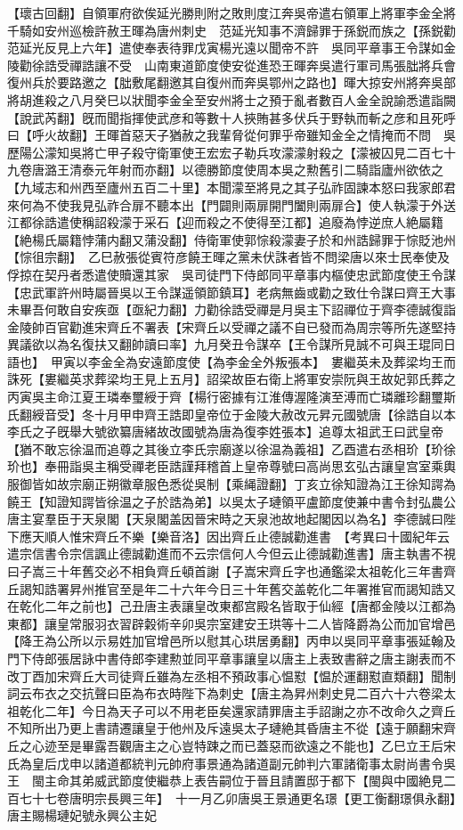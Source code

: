 【瓌古回翻】自領軍府欲俟延光勝則附之敗則度江奔吳帝遣右領軍上將軍李金全將千騎如安州巡檢許赦王暉為唐州刺史　范延光知事不濟歸罪于孫鋭而族之【孫鋭勸范延光反見上六年】遣使奉表待罪戊寅楊光遠以聞帝不許　吳同平章事王令謀如金陵勸徐誥受禪誥讓不受　山南東道節度使安從進恐王暉奔吳遣行軍司馬張朏將兵會復州兵於要路邀之【朏敷尾翻邀其自復州而奔吳鄂州之路也】暉大掠安州將奔吳部將胡進殺之八月癸巳以狀聞李金全至安州將士之預于亂者數百人金全說諭悉遣詣闕【說武芮翻】旣而聞指揮使武彦和等數十人挾賄甚多伏兵于野執而斬之彦和且死呼曰【呼火故翻】王暉首惡天子猶赦之我輩脅從何罪乎帝雖知金全之情掩而不問　吳歷陽公濛知吳將亡甲子殺守衛軍使王宏宏子勒兵攻濛濛射殺之【濛被囚見二百七十九卷唐潞王清泰元年射而亦翻】以德勝節度使周本吳之勲舊引二騎詣廬州欲依之【九域志和州西至廬州五百二十里】本聞濛至將見之其子弘祚固諫本怒曰我家郎君來何為不使我見弘祚合扉不聽本出【門闢則兩扉開門闔則兩扉合】使人執濛于外送江都徐誥遣使稱詔殺濛于采石【迎而殺之不使得至江都】追廢為悖逆庶人絶屬籍【絶楊氏屬籍悖蒲内翻又蒲没翻】侍衛軍使郭悰殺濛妻子於和州誥歸罪于悰貶池州【悰徂宗翻】　乙巳赦張從賓符彦饒王暉之黨未伏誅者皆不問梁唐以來士民奉使及俘掠在契丹者悉遣使贖還其家　吳司徒門下侍郎同平章事内樞使忠武節度使王令謀【忠武軍許州時屬晉吳以王令謀遥領節鎮耳】老病無齒或勸之致仕令謀曰齊王大事未畢吾何敢自安疾亟【亟紀力翻】力勸徐誥受禪是月吳主下詔禪位于齊李德誠復詣金陵帥百官勸進宋齊丘不署表【宋齊丘以受禪之議不自已發而為周宗等所先遂堅持異議欲以為名復扶又翻帥讀曰率】九月癸丑令謀卒【王令謀所見誠不可與王琨同日語也】　甲寅以李金全為安遠節度使【為李金全外叛張本】　婁繼英未及葬梁均王而誅死【婁繼英求葬梁均王見上五月】詔梁故臣右衛上將軍安崇阮與王故妃郭氏葬之　丙寅吳主命江夏王璘奉璽綬于齊【楊行密據有江淮傳渥隆演至溥而亡璘離珍翻璽斯氏翻綬音受】冬十月甲申齊王誥即皇帝位于金陵大赦改元昇元國號唐【徐誥自以本李氏之子旣舉大號欲纂唐緒故改國號為唐為復李姓張本】追尊太祖武王曰武皇帝【猶不敢忘徐温而追尊之其後立李氏宗廟遂以徐温為義祖】乙酉遣右丞相玠【玠徐玠也】奉冊詣吳主稱受禪老臣誥謹拜稽首上皇帝尊號曰高尚思玄弘古讓皇宫室乘輿服御皆如故宗廟正朔徽章服色悉從吳制【乘䋲證翻】丁亥立徐知證為江王徐知諤為饒王【知證知諤皆徐温之子於誥為弟】以吳太子璉領平盧節度使兼中書令封弘農公唐主宴羣臣于天泉閣【天泉閣盖因晉宋時之天泉池故地起閣因以為名】李德誠曰陛下應天順人惟宋齊丘不樂【樂音洛】因出齊丘止德誠勸進書　【考異曰十國紀年云遣宗信書令宗信諷止德誠勸進而不云宗信何人今但云止德誠勸進書】唐主執書不視曰子嵩三十年舊交必不相負齊丘頓首謝【子嵩宋齊丘字也通鑑梁太祖乾化三年書齊丘謁知誥署昇州推官至是年二十六年今日三十年舊交盖乾化二年署推官而謁知誥又在乾化二年之前也】己丑唐主表讓皇改東都宫殿名皆取于仙經【唐都金陵以江都為東都】讓皇常服羽衣習辟糓術辛卯吳宗室建安王珙等十二人皆降爵為公而加官增邑【降王為公所以示易姓加官增邑所以慰其心珙居勇翻】丙申以吳同平章事張延翰及門下侍郎張居詠中書侍郎李建勲並同平章事讓皇以唐主上表致書辭之唐主謝表而不改丁酉加宋齊丘大司徒齊丘雖為左丞相不預政事心愠懟【愠於運翻懟直類翻】聞制詞云布衣之交抗聲曰臣為布衣時陛下為刺史【唐主為昇州刺史見二百六十六卷梁太祖乾化二年】今日為天子可以不用老臣矣還家請罪唐主手詔謝之亦不改命久之齊丘不知所出乃更上書請遷讓皇于他州及斥遠吳太子璉絶其昏唐主不從【遠于願翻宋齊丘之心迹至是畢露吾觀唐主之心豈特踈之而已蓋惡而欲遠之不能也】乙巳立王后宋氏為皇后戊申以諸道都統判元帥府事景通為諸道副元帥判六軍諸衛事太尉尚書令吳王　閩主命其弟威武節度使繼恭上表告嗣位于晉且請置邸于都下【閩與中國絶見二百七十七卷唐明宗長興三年】　十一月乙卯唐吳王景通更名璟【更工衡翻璟俱永翻】唐主賜楊璉妃號永興公主妃